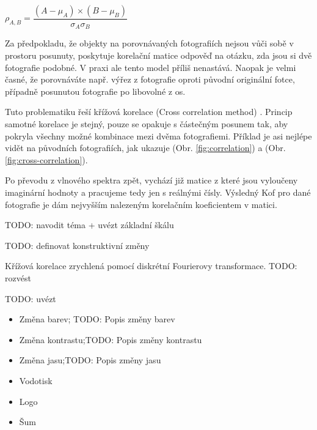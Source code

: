 $ \rho_{A,B} = \dfrac{(A - \mu_{A}) × (B - \mu_{B})}{\sigma_{A}\sigma_{B}} $

Za předpokladu, že objekty na porovnávaných fotografiích nejsou vůči sobě v prostoru posunuty, poskytuje korelační matice odpověď na otázku, zda jsou si dvě fotografie podobné. V praxi ale tento model příliš nenastává. Naopak je velmi časné, že porovnáváte např. výřez z fotografie oproti původní originální fotce, případně posunutou fotografie po libovolné z os.

Tuto problematiku řeší křížová korelace (Cross correlation method) \cite{cross-correlation}. Princip samotné korelace je stejný, pouze se opakuje s částečným posunem tak, aby pokryla všechny možné kombinace mezi dvěma fotografiemi. Příklad je asi nejlépe vidět na původních fotografiích, jak ukazuje (Obr. \ref{fig:correlation}) a (Obr. \ref{fig:cross-correlation}).



Po převodu z vlnového spektra zpět, vychází již matice z které jsou vyloučeny imaginární hodnoty a pracujeme tedy jen s reálnými čísly. Výsledný Kof pro dané fotografie je dám nejvyšším nalezeným korelačním koeficientem v matici.

TODO: navodit téma + uvézt základní škálu

TODO: definovat konstruktivní změny

Křížová korelace zrychlená pomocí diskrétní Fourierovy transformace.
TODO: rozvést

TODO: uvézt

\begin{itemize}
	\setlength{\parskip}{0pt}
	\setlength{\itemsep}{0pt}
	\item{Změna barev; TODO: Popis změny barev}
	\item{Změna kontrastu;TODO: Popis změny kontrastu}
	\item{Změna jasu;TODO: Popis změny jasu}
\end{itemize}

\begin{itemize}
	\setlength{\parskip}{0pt}
	\setlength{\itemsep}{0pt}
	\item{Vodotisk}
	\item{Logo}
	\item{Šum}
\end{itemize}

